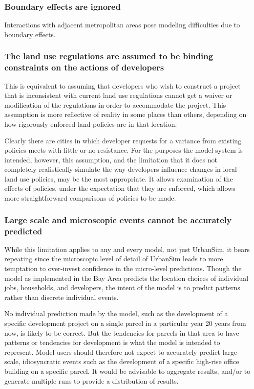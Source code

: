 \subsubsection{Boundary effects are ignored}

Interactions with adjacent metropolitan areas pose
modeling difficulties due to boundary effects.

\subsubsection{The land use regulations are assumed to be binding constraints
on the actions of developers}

This is equivalent to assuming that developers who wish to construct a project that is inconsistent with current land use regulations cannot get a waiver or modification of the regulations in order to accommodate the project. This assumption
is more reflective of reality in some places than others, depending on how rigorously enforced land policies are in that location.

Clearly there are cities in which developer requests for a variance from existing policies meets with little or no resistance. For the purposes the model system is intended, however, this assumption, and the limitation that it does not completely realistically simulate the way developers influence changes in local land use policies, may be the most appropriate. It allows examination of the effects of policies, under the expectation that they are enforced, which allows more straightforward comparisons of policies to be made.

\subsubsection{Large scale and microscopic events cannot be accurately predicted}

While this limitation applies to any and every model, not just UrbanSim, it bears repeating since the microscopic level of detail of UrbanSim leads to more temptation to over-invest confidence in the micro-level predictions. Though the model as implemented in the Bay Area predicts the location choices of individual jobs, households, and developers, the intent of the model is to predict patterns rather than discrete individual events.

No individual prediction made by the model, such as the development of a specific development project on a single parcel in a particular year 20 years from now, is likely to be correct. But the tendencies for parcels in that area to have patterns or tendencies for development is what the model is intended to represent. Model users should therefore not expect to accurately predict large-scale, idiosyncratic events such as the development of a specific high-rise office building on a specific parcel. It would be advisable to aggregate results, and/or to generate multiple runs to provide a distribution of results.


